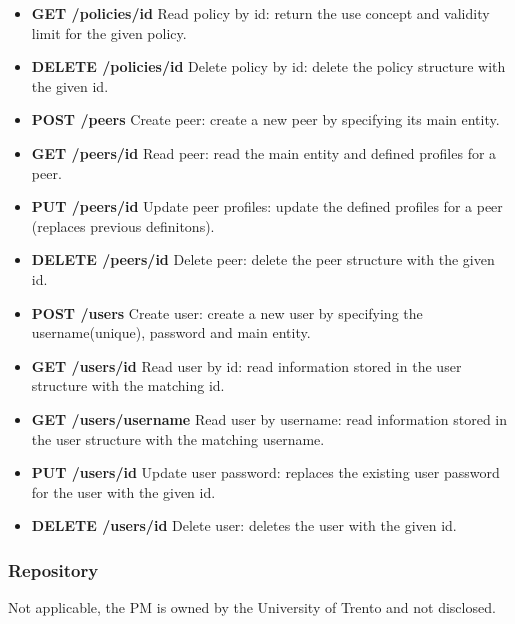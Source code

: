 \begin{itemize}
\item {\bf GET /policies/id} Read policy by id: return the use concept and validity limit for the given policy.
\item {\bf DELETE /policies/id} Delete policy by id: delete the policy structure with the given id.		
\item {\bf POST /peers}	Create peer: create a new peer by specifying its main entity.			
\item {\bf GET /peers/id} Read peer: read the main entity and defined profiles for a peer.
\item {\bf PUT /peers/id} Update peer profiles: update the defined profiles for a peer (replaces previous definitons).
\item {\bf DELETE /peers/id} Delete peer: delete the peer structure with the given id.
\item {\bf POST /users}	Create user: create a new user by specifying the username(unique), password and main entity.											
\item {\bf GET /users/id} Read user by id: read information stored in the user structure with the matching id.											
\item {\bf GET /users/username}	Read user by username: read information stored in the user structure with the matching username.										
\item {\bf PUT /users/id} Update user password: replaces the existing user password for the user with the given id.	
\item {\bf DELETE /users/id} Delete user: deletes the user with the given id.
\end{itemize}
\subsubsection{Repository}
Not applicable, the PM is owned by the University of Trento and not disclosed. 